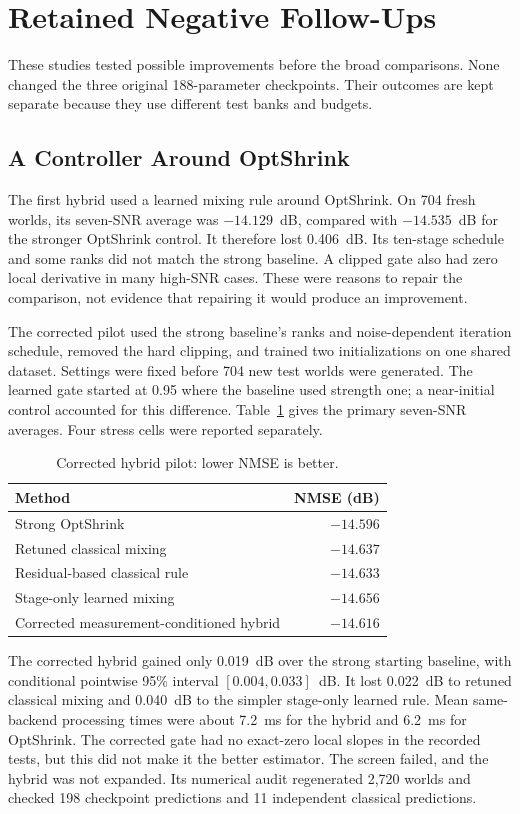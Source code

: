 \section{Retained Negative Follow-Ups}
These studies tested possible improvements before the broad comparisons.
None changed the three original 188-parameter checkpoints. Their outcomes
are kept separate because they use different test banks and budgets.

\subsection{A Controller Around OptShrink}
The first hybrid used a learned mixing rule around OptShrink. On 704 fresh
worlds, its seven-SNR average was $-14.129$~dB, compared with
$-14.535$~dB for the stronger OptShrink control. It therefore lost
0.406~dB. Its ten-stage schedule and some ranks did not match the strong
baseline. A clipped gate also had zero local derivative in many high-SNR
cases. These were reasons to repair the comparison, not evidence that
repairing it would produce an improvement.

The corrected pilot used the strong baseline's ranks and noise-dependent
iteration schedule, removed the hard clipping, and trained two
initializations on one shared dataset. Settings were fixed before 704 new
test worlds were generated. The learned gate started at 0.95 where the
baseline used strength one; a near-initial control accounted for this
difference. Table~\ref{tab:hybrid-retained} gives the primary seven-SNR
averages. Four stress cells were reported separately.

\begin{table}[!t]
\caption{Corrected hybrid pilot: lower NMSE is better.}
\label{tab:hybrid-retained}\centering\small
\begin{tabular}{@{}lr@{}}\toprule
Method & NMSE (dB)\\\midrule
Strong OptShrink & $-14.596$\\
Retuned classical mixing & $-14.637$\\
Residual-based classical rule & $-14.633$\\
Stage-only learned mixing & $-14.656$\\
Corrected measurement-conditioned hybrid & $-14.616$\\\bottomrule
\end{tabular}
\end{table}

The corrected hybrid gained only 0.019~dB over the strong starting
baseline, with conditional pointwise 95\% interval
$[0.004,0.033]$~dB. It lost 0.022~dB to retuned classical mixing and
0.040~dB to the simpler stage-only learned rule. Mean same-backend
processing times were about 7.2~ms for the hybrid and 6.2~ms for
OptShrink. The corrected gate had no exact-zero local slopes in the
recorded tests, but this did not make it the better estimator. The
screen failed, and the hybrid was not expanded. Its numerical audit
regenerated 2,720 worlds and checked 198 checkpoint predictions and
11 independent classical predictions.

